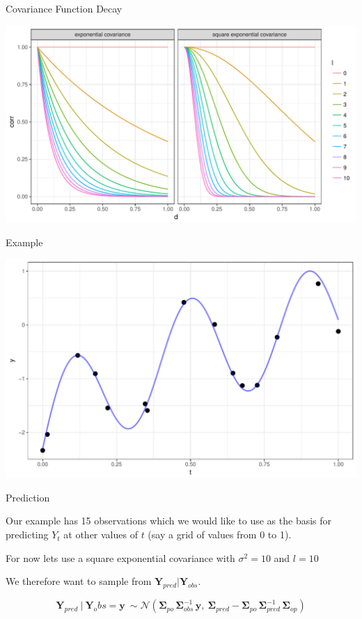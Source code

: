 \documentclass[11pt,ignorenonframetext,]{beamer}
\begin{document}
\begin{frame}{Covariance Function Decay}

\includegraphics{Lec12_files/figure-beamer/unnamed-chunk-2-1.pdf}

\end{frame}

\begin{frame}{Example}

\begin{center}\includegraphics{Lec12_files/figure-beamer/unnamed-chunk-3-1} \end{center}

\end{frame}

\begin{frame}[t]{Prediction}

Our example has 15 observations which we would like to use as the basis
for predicting \(Y_t\) at other values of \(t\) (say a grid of values
from 0 to 1).

\vspace{3mm}

\pause

For now lets use a square exponential covariance with \(\sigma^2 = 10\)
and \(l=10\)

\vspace{3mm}

\pause

We therefore want to sample from \(\bm{Y}_{pred} | \bm{Y}_{obs}\).

\[\bm Y_{pred} ~|~ \bm{Y}_obs = \bm{y} ~\sim \mathcal{N}(\bm\Sigma_{po} \, \bm\Sigma_{obs}^{-1} \, \bm{y},~ \bm\Sigma_{pred}-\bm\Sigma_{po}\,\bm\Sigma_{pred}^{-1} \, \bm\Sigma_{op})\]

\end{frame}
\end{document}
